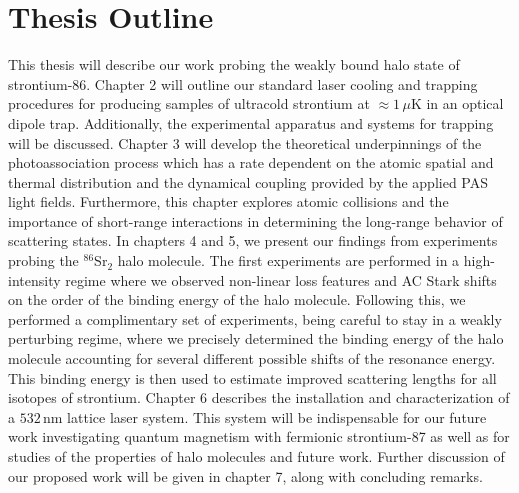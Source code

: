 \section{Thesis Outline} \label{sec:outline}
This thesis will describe our work probing the weakly bound halo state of strontium-86.
Chapter 2 will outline our standard laser cooling and trapping procedures for producing samples of ultracold strontium at $\approx1\,\mu$K in an optical dipole trap. 
Additionally, the experimental apparatus and systems for trapping will be discussed.
Chapter 3 will develop the theoretical underpinnings of the photoassociation process which has a rate dependent on the atomic spatial and thermal distribution and the dynamical coupling provided by the applied PAS light fields.
Furthermore, this chapter explores atomic collisions and the importance of short-range interactions in determining the long-range behavior of scattering states.
In chapters 4 and 5, we present our findings from experiments probing the $^{86}$Sr$_2$ halo molecule.
The first experiments are performed in a high-intensity regime where we observed non-linear loss features and AC Stark shifts on the order of the binding energy of the halo molecule.
Following this, we performed a complimentary set of experiments, being careful to stay in a weakly perturbing regime, where we precisely determined the binding energy of the halo molecule accounting for several different possible shifts of the resonance energy.
This binding energy is then used to estimate improved scattering lengths for all isotopes of strontium.
Chapter 6 describes the installation and characterization of a $532$\,nm lattice laser system.
This system will be indispensable for our future work investigating quantum magnetism with fermionic strontium-87 as well as for studies of the properties of halo molecules and future work.
Further discussion of our proposed work will be given in chapter 7, along with concluding remarks.






%
%
%
%
%
%
%
%
%

